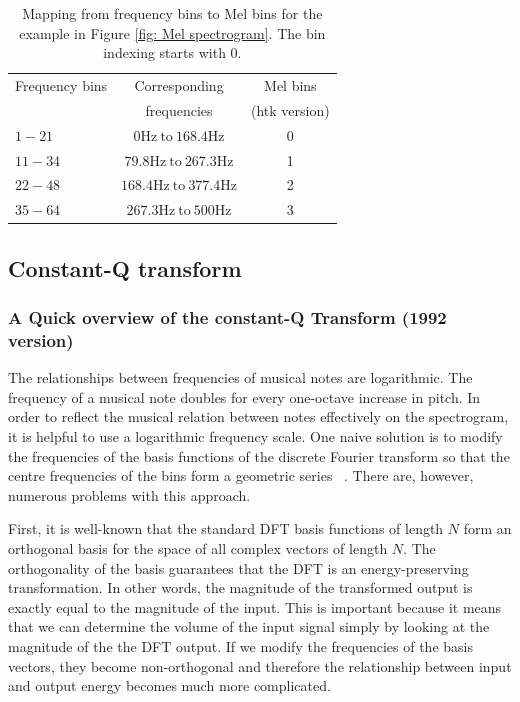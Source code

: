 \documentclass{ieeeaccess}
\begin{document}
\begin{table}\centering
\caption{Mapping from frequency bins to Mel bins for the example in Figure \ref{fig: Mel spectrogram}. The bin indexing starts with 0.}
\label{tab:mel}
\setlength{\tabcolsep}{3pt}
\begin{tabular}{lcc}
\toprule
Frequency bins& 
Corresponding & 
Mel bins\\
&frequencies& (htk version)\\
\midrule
$1-21$& $0\text{Hz} \ \text{to}\ 168.4$Hz & 0 \\
$11-34$& $79.8\text{Hz} \ \text{to}\ 267.3$Hz & 1 \\
$22-48$& $168.4\text{Hz} \ \text{to}\ 377.4$Hz & 2 \\
$35-64$& $267.3\text{Hz} \ \text{to}\ 500$Hz & 3 \\
\bottomrule
\end{tabular}
\label{tab1}
\end{table}




\subsection{Constant-Q transform}
\subsubsection{A Quick overview of the constant-Q Transform (1992 version)}
The relationships between frequencies of musical notes are logarithmic. The frequency of a musical note doubles for every one-octave increase in pitch. In order to reflect the musical relation between notes effectively on the spectrogram, it is helpful to use a logarithmic frequency scale. One naive solution is to modify the frequencies of the basis functions of the discrete Fourier transform so that the centre frequencies of the bins form a geometric series ~\cite{haines1988logarithmic}. There are, however, numerous problems with this approach. 


First, it is well-known that the standard DFT basis functions of length $N$ form an orthogonal basis for the space of all complex vectors of length $N$. The orthogonality of the basis guarantees that the DFT is an energy-preserving transformation. In other words, the magnitude of the transformed output is exactly equal to the magnitude of the input. This is important because it means that we can determine the volume of the input signal simply by looking at the magnitude of the the DFT output. If we modify the frequencies of the basis vectors, they become non-orthogonal and therefore the relationship between input and output energy becomes much more complicated. 
\end{document}
